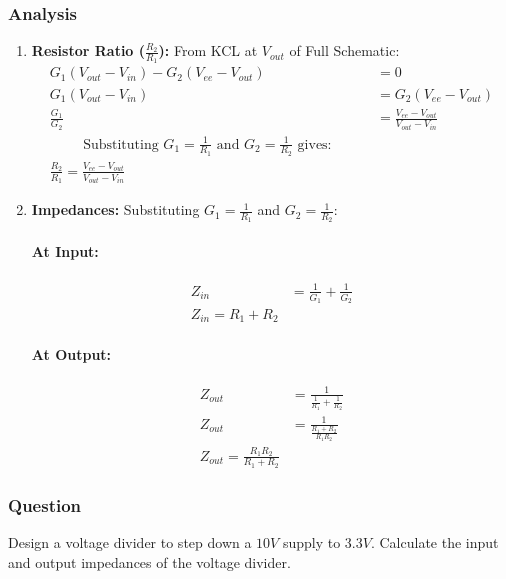\subsubsection{Analysis}
\begin{enumerate}
  \item \textbf{Resistor Ratio (\(\frac{R_2}{R_1}\)):}
    From KCL at \(V_{out}\) of Full Schematic:
    \begin{align*}
      G_1(V_{out} - V_{in}) - G_2(V_{ee} - V_{out}) &= 0 \\
      G_1(V_{out} - V_{in}) &= G_2(V_{ee} - V_{out}) \\
      \frac{G_1}{G_2} &= \frac{V_{ee} - V_{out}}{V_{out} - V_{in}} \\
      \hspace{1cm} \text{Substituting } G_1 = \frac{1}{R_1} \text{ and } G_2 = \frac{1}{R_2} \text{ gives:} \hspace{1cm} \\
      \boxed{\frac{R_2}{R_1} = \frac{V_{ee} - V_{out}}{V_{out} - V_{in}}}
    \end{align*}
  \item \textbf{Impedances:}
    Substituting \(G_1 = \frac{1}{R_1}\) and \(G_2 = \frac{1}{R_2}\):
    \paragraph{At Input:}
      \begin{align*}
        Z_{in} &= \frac{1}{G_1} + \frac{1}{G_2} \\
        \boxed{Z_{in} = R_1 + R_2}
      \end{align*}
    \paragraph{At Output:}
      \begin{align*}
        Z_{out} &= \frac{1}{\frac{1}{R_1} + \frac{1}{R_2}} \\
        Z_{out} &= \frac{1}{\frac{R_1 + R_2}{R_1 R_2}} \\
        \boxed{Z_{out} = \frac{R_1 R_2}{R_1 + R_2}}
      \end{align*}
\end{enumerate}

\subsubsection{Question}
Design a voltage divider to step down a \(10V\) supply
to \(3.3V\). Calculate the input and output impedances
of the voltage divider.
